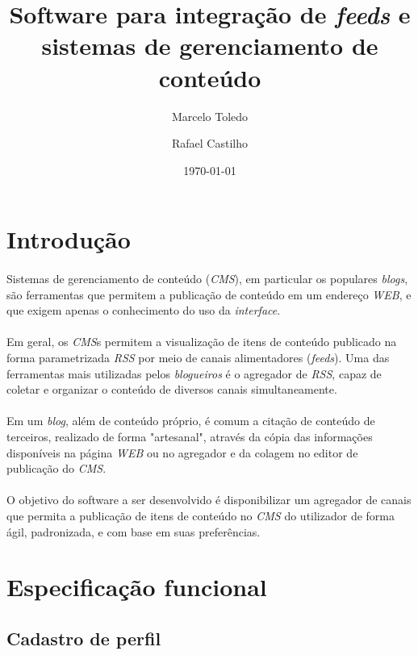 \documentclass[a4paper,12pt]{article}
\def\cms{\emph{CMS}}
\def\rss{\emph{RSS}}
\begin{document}
\title{Software para integração de \emph{feeds} e sistemas de gerenciamento de conteúdo}
\author{Marcelo Toledo \and Rafael Castilho}
\date{\today}
\maketitle

\newpage
\section{Introdução}

\paragraph{}
Sistemas de gerenciamento de conteúdo (\cms{}), em particular os populares \emph{blogs}, são ferramentas que permitem a publicação de conteúdo em um endereço \emph{WEB}, e que exigem apenas o conhecimento do uso da \emph{interface}.
\paragraph{}
Em geral, os \cms{}s permitem a visualização de itens de conteúdo publicado na forma parametrizada \rss{} por meio de canais alimentadores (\emph{feeds}). Uma das ferramentas mais utilizadas pelos \emph{blogueiros} é o agregador de \rss{}, capaz de coletar e organizar o conteúdo de diversos canais simultaneamente.
\paragraph{}
Em um \emph{blog}, além de conteúdo próprio, é comum a citação de conteúdo de terceiros, realizado de forma "artesanal", através da cópia das informações disponíveis na página \emph{WEB} ou no agregador e da colagem no editor de publicação do \cms{}.
\paragraph{}
O objetivo do software a ser desenvolvido é disponibilizar um agregador de canais que permita a publicação de itens de conteúdo no \cms{} do utilizador de forma ágil, padronizada, e com base em suas preferências.

\section{Especificação funcional}

\subsection{Cadastro de perfil}
\end{document}
